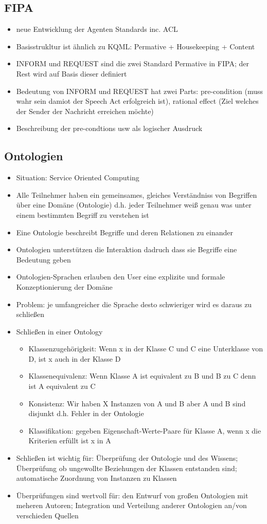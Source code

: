 \documentclass{article} %
\begin{document}
	\subsection{FIPA}
	\begin{itemize}
		\item neue Entwicklung der Agenten Standards inc. ACL
		\item Basisstrukltur ist ähnlich zu KQML: Permative + Housekeeping + Content
		\item INFORM und REQUEST sind die zwei Standard Permative in FIPA; der Rest wird auf Basis dieser definiert
		\item Bedeutung von INFORM und REQUEST hat zwei Parts: pre-condition (muss wahr sein damiot der Speech Act erfolgreich ist), rational effect (Ziel welches der Sender der Nachricht erreichen möchte)
		\item Beschreibung der pre-condtions usw als logischer Ausdruck
	\end{itemize}
	\subsection{Ontologien}
	\begin{itemize}
		\item Situation: Service Oriented Computing
		\item Alle Teilnehmer haben ein gemeinsames, gleiches Verständniss von Begriffen über eine Domäne (Ontologie) d.h. jeder Teilnehmer weiß genau was unter einem bestimmten Begriff zu verstehen ist
		\item Eine Ontologie beschreibt Begriffe und deren Relationen zu einander
		\item Ontologien unterstützen die Interaktion dadruch dass sie Begriffe eine Bedeutung geben
		\item Ontologien-Sprachen erlauben den User eine explizite und formale Konzeptionierung der Domäne
		\item Problem: je umfangreicher die Sprache desto schwieriger wird es daraus zu schließen
		\item Schließen in einer Ontology
		\begin{itemize}
			\item Klassenzugehörigkeit: Wenn x in der Klasse C und C eine Unterklasse von D, ist x auch in der Klasse D
			\item Klassenequivalenz: Wenn Klasse A ist equivalent zu B und B zu C denn ist A equivalent zu C
			\item Konsistenz: Wir haben X Instanzen von A und B aber  A und B sind disjunkt d.h. Fehler in der Ontologie
			\item Klassifikation: gegeben Eigenschaft-Werte-Paare für Klasse A, wenn x die Kriterien erfüllt ist x in A
		\end{itemize}
		\item Schließen ist wichtig für: Überprüfung der Ontologie und des Wissens; Überprüfung ob ungewollte Beziehungen der Klassen entstanden sind; automatische Zuordnung von Instanzen zu Klassen
		\item Überprüfungen sind wertvoll für: den Entwurf von großen Ontologien mit meheren Autoren; Integration und Verteilung anderer Ontologien an/von verschieden Quellen
	\end{itemize}
\end{document}
